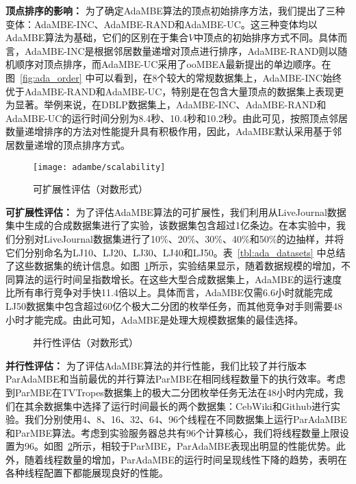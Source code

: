 \textbf{顶点排序的影响：} 为了确定AdaMBE算法的顶点初始排序方法，我们提出了三种变体：AdaMBE-INC、AdaMBE-RAND和AdaMBE-UC。这三种变体均以AdaMBE算法为基础，它们的区别在于集合$V$中顶点的初始排序方式不同。具体而言，AdaMBE-INC是根据邻居数量递增对顶点进行排序，AdaMBE-RAND则以随机顺序对顶点排序，而AdaMBE-UC采用了ooMBEA最新提出的单边顺序。在图~\ref{fig:ada_order} 中可以看到，在8个较大的常规数据集上，AdaMBE-INC始终优于AdaMBE-RAND和AdaMBE-UC，特别是在包含大量顶点的数据集上表现更为显著。举例来说，在DBLP数据集上，AdaMBE-INC、AdaMBE-RAND和AdaMBE-UC的运行时间分别为8.4秒、10.4秒和10.2秒。由此可见，按照顶点邻居数量递增排序的方法对性能提升具有积极作用，因此，AdaMBE默认采用基于邻居数量递增的顶点排序方式。

\begin{figure} [t]
	\centering
		\vspace{0.1in}
		\texttt{[image: adambe/scalability]}
	\caption{可扩展性评估（对数形式）}
	\label{fig:ada_scalability}
\end{figure}



\textbf{可扩展性评估：} 为了评估AdaMBE算法的可扩展性，我们利用从LiveJournal数据集中生成的合成数据集进行了实验，该数据集包含超过1亿条边。在本实验中，我们分别对LiveJournal数据集进行了10\%、20\%、30\%、40\%和50\%的边抽样，并将它们分别命名为LJ10、LJ20、LJ30、LJ40和LJ50。表~\ref{tbl:ada_datasets} 中总结了这些数据集的统计信息。如图~\ref{fig:ada_scalability}所示，实验结果显示，随着数据规模的增加，不同算法的运行时间呈指数增长。在这些大型合成数据集上，AdaMBE的运行速度比所有串行竞争对手快11.4倍以上。具体而言，AdaMBE仅需6.6小时就能完成LJ50数据集中包含超过60亿个极大二分团的枚举任务，而其他竞争对手则需要48小时才能完成。由此可知，AdaMBE是处理大规模数据集的最佳选择。

\begin{figure} [H]
	\centering

  \quad

	\caption{并行性评估（对数形式）}
	\label{fig:ada_parallel}

\end{figure}

\textbf{并行性评估：} 为了评估AdaMBE算法的并行性能，我们比较了并行版本ParAdaMBE和当前最优的并行算法ParMBE在相同线程数量下的执行效率。考虑到ParMBE在TVTropes数据集上的极大二分团枚举任务无法在48小时内完成，我们在其余数据集中选择了运行时间最长的两个数据集：CebWiki和Github进行实验。我们分别使用4、8、16、32、64、96个线程在不同数据集上运行ParAdaMBE和ParMBE算法。考虑到实验服务器总共有96个计算核心，我们将线程数量上限设置为96。如图~\ref{fig:ada_parallel}所示，相较于ParMBE，ParAdaMBE表现出明显的性能优势。此外，随着线程数量的增加，ParAdaMBE的运行时间呈现线性下降的趋势，表明在各种线程配置下都能展现良好的性能。

